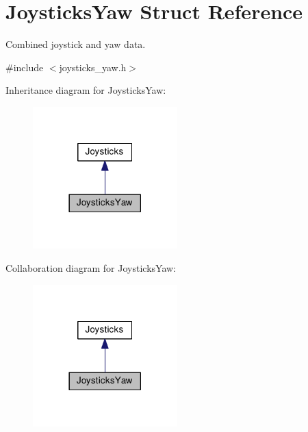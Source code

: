 \hypertarget{structJoysticksYaw}{\section{Joysticks\-Yaw Struct Reference}
\label{structJoysticksYaw}
}


Combined joystick and yaw data.  




{\ttfamily \#include $<$joysticks\-\_\-yaw.\-h$>$}



Inheritance diagram for Joysticks\-Yaw\-:\nopagebreak
\begin{figure}[H]
\begin{center}
\leavevmode
\includegraphics[width=158pt]{structJoysticksYaw__inherit__graph}
\end{center}
\end{figure}


Collaboration diagram for Joysticks\-Yaw\-:\nopagebreak
\begin{figure}[H]
\begin{center}
\leavevmode
\includegraphics[width=158pt]{structJoysticksYaw__coll__graph}
\end{center}
\end{figure}

